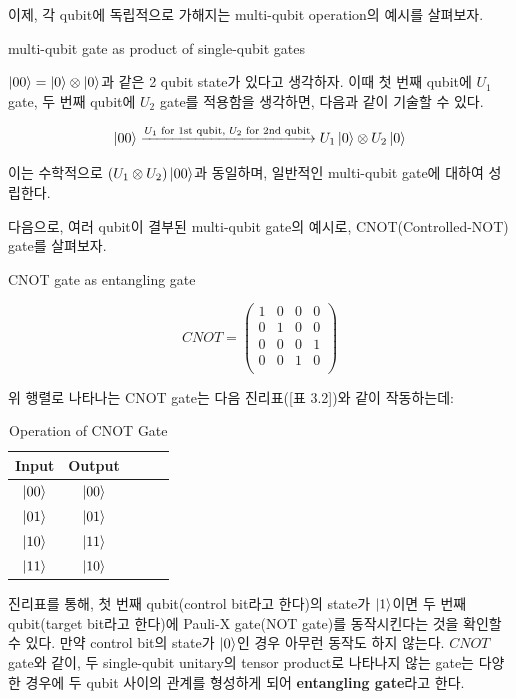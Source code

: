 \noindent 이제, 각 qubit에 독립적으로 가해지는 multi-qubit operation의 예시를 살펴보자.

\begin{example} %
multi-qubit gate as product of single-qubit gates

\noindent \(\ket{00} = \ket{0} \otimes \ket{0}\)과 같은 2 qubit state가 있다고 생각하자. 이때 첫 번째 qubit에 \(U_1\) gate, 두 번째 qubit에 \(U_2\) gate를 적용함을 생각하면, 다음과 같이 기술할 수 있다.

\[
\ket{00} \xrightarrow[]{U_1 \text{ for 1st qubit, } U_2 \text{ for 2nd qubit}} U_1\ket{0} \otimes U_2\ket{0}
\]

\noindent 이는 수학적으로 \((U_1 \otimes U_2)\ket{00}\)과 동일하며, 일반적인 multi-qubit gate에 대하여 성립한다.
\end{example}

다음으로, 여러 qubit이 결부된 multi-qubit gate의 예시로, CNOT(Controlled-NOT) gate를 살펴보자.
\begin{example}
CNOT gate as entangling gate

\[CNOT = \begin{pmatrix}
    1 & 0 & 0 & 0 \\
    0 & 1 & 0 & 0 \\
    0 & 0 & 0 & 1 \\
    0 & 0 & 1 & 0 \\
\end{pmatrix}\]

\noindent 위 행렬로 나타나는 CNOT gate는 다음 진리표([표 3.2])와 같이 작동하는데:

\begin{table}[htb!]
    \centering
    \begin{tabular}{|c|c|c|c|c|}
        \hline
         Input & Output \\ \hline
         $\ket{00}$ & $\ket{00}$ \\ \hline
         $\ket{01}$ & $\ket{01}$ \\ \hline
         $\ket{10}$ & $\ket{11}$ \\ \hline
         $\ket{11}$ & $\ket{10}$ \\ \hline
    \end{tabular}
    \caption{Operation of CNOT Gate}
    \label{tab:CNOT Operation}
\end{table}
진리표를 통해, 첫 번째 qubit(control bit라고 한다)의 state가 $\ket 1$이면 두 번째 qubit(target bit라고 한다)에 Pauli-X gate(NOT gate)를 동작시킨다는 것을 확인할 수 있다. 만약 control bit의 state가 $\ket 0$인 경우 아무런 동작도 하지 않는다.
\noindent $CNOT$ gate와 같이, 두 single-qubit unitary의 tensor product로 나타나지 않는 gate는 다양한 경우에 두 qubit 사이의 관계를 형성하게 되어 \textbf{entangling gate}라고 한다.
\end{example}

